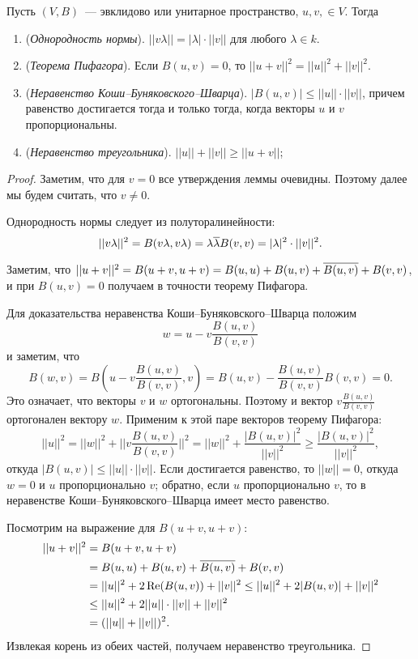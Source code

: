 \begin{lemma}\label{lem:triangle_inequality}
Пусть $(V,B)$~--- эвклидово или унитарное пространство, $u,v,\in V$. Тогда
\begin{enumerate}
\item ({\it Однородность нормы}). $||v\lambda|| = |\lambda|\cdot
  ||v||$ для любого $\lambda\in k$.
\item ({\it Теорема Пифагора}). Если $B(u,v)=0$, то $||u+v||^2 = ||u||^2
  + ||v||^2$.
\item ({\it Неравенство Коши--Буняковского--Шварца}).
$|B(u,v)|\leq ||u||\cdot ||v||$, причем равенство достигается тогда и
только тогда, когда векторы $u$ и $v$ пропорциональны.
\item ({\it Неравенство треугольника}). $||u||+||v||\geq ||u+v||$;
\end{enumerate}
\end{lemma}
\begin{proof}
Заметим, что для $v=0$ все утверждения леммы очевидны. Поэтому далее
мы будем считать, что $v\neq 0$.

Однородность нормы следует из полуторалинейности:
$$
||v\lambda||^2 = B(v\lambda, v\lambda ) =
\lambda\overline{\lambda}B(v,v) = |\lambda|^2\cdot ||v||^2.
$$

Заметим, что $||u+v||^2 = B(u+v,u+v) = B(u,u) + B(u,v) +
\overline{B(u,v)} + B(v,v)$, и при $B(u,v)=0$ получаем в точности теорему
Пифагора.

Для доказательства неравенства Коши--Буняковского--Шварца положим
$$
w = u - v\frac{B(u,v)}{B(v,v)}
$$
и заметим, что $$B(w,v) = B(u-v\frac{B(u,v)}{B(v,v)},v)
 = B(u,v) - \frac{B(u,v)}{B(v,v)}B(v,v) = 0.$$
Это означает, что векторы $v$ и $w$ ортогональны. Поэтому и вектор
$v\frac{B(u,v)}{B(v,v)}$ ортогонален вектору $w$. Применим к этой паре
векторов теорему Пифагора:
$$
||u||^2 = ||w||^2 + ||v\frac{B(u,v)}{B(v,v)}||^2 = ||w||^2 +
\frac{|B(u,v)|^2}{||v||^2} \geq \frac{|B(u,v)|^2}{||v||^2},
$$
откуда $|B(u,v)|\leq ||u||\cdot ||v||$.
Если достигается равенство, то $||w||=0$, откуда $w=0$ и $u$
пропорционально $v$; обратно, если $u$ пропорционально $v$, то
в неравенстве Коши--Буняковского--Шварца имеет место равенство.

Посмотрим на выражение для $B(u+v,u+v)$:
\begin{align*}
||u+v||^2 &= B(u+v,u+v)\\
&= B(u,u) + B(u,v) + \overline{B(u,v)}+ B(v,v)\\
&= ||u||^2 + 2\operatorname{Re}(B(u,v)) + ||v||^2 \leq ||u||^2 + 2|B(u,v)| + ||v||^2\\
&\leq ||u||^2 +2||u||\cdot ||v|| + ||v||^2\\
&= (||u||+||v||)^2.
\end{align*}
Извлекая корень из обеих частей, получаем неравенство треугольника.
\end{proof}

